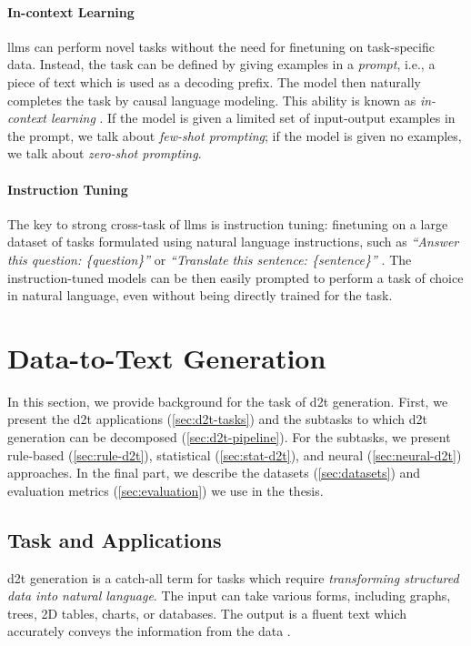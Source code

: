 {\paragraph{In-context Learning} \acp{llm} can perform novel tasks without the need for finetuning on task-specific data. Instead, the task can be defined by giving examples in a \emph{prompt}, i.e., a piece of text which is used as a decoding prefix. The model then naturally completes the task by causal language modeling. This ability is known as \emph{in-context learning} \cite{brown2020language,dong2022survey}. If the model is given a limited set of input-output examples in the prompt, we talk about \emph{few-shot prompting}; if the model is given no examples, we talk about \emph{zero-shot prompting}.

\paragraph{Instruction Tuning} The key to strong cross-task of \acp{llm} is instruction tuning: finetuning on a large dataset of tasks formulated using natural language instructions, such as \textit{``Answer this question: \{question\}''} or \textit{``Translate this sentence: \{sentence\}''} \cite{sanh2021multitask,ouyang2022training}. The instruction-tuned models can be then easily prompted to perform a task of choice in natural language, even without being directly trained for the task.



\section{Data-to-Text Generation}
\label{sec:d2t}
In this section, we provide background for the task of \ac{d2t} generation. First, we present the \ac{d2t} applications (\autoref{sec:d2t-tasks}) and the subtasks to which \ac{d2t} generation can be decomposed (\autoref{sec:d2t-pipeline}). For the subtasks, we present rule-based (\autoref{sec:rule-d2t}), statistical (\autoref{sec:stat-d2t}), and neural (\autoref{sec:neural-d2t}) approaches. In the final part, we describe the datasets (\autoref{sec:datasets}) and evaluation metrics (\autoref{sec:evaluation}) we use in the thesis.

\subsection{Task and Applications}
\label{sec:d2t-tasks}

\ac{d2t} generation is a catch-all term for tasks which require \emph{transforming structured data into natural language}. The input can take various forms, including graphs, trees, 2D tables, charts, or databases. The output is a fluent text which accurately conveys the information from the data \cite{gattSurveyStateArt2018,sharmaInnovationsNeuralDatatotext2022}.

}
